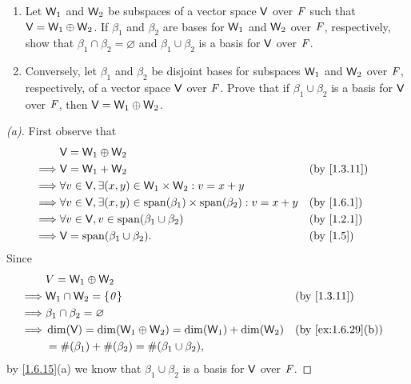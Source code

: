 \setcounter{ex}{32}
\begin{ex}\label{ex:1.6.33}
	\quad
	\begin{enumerate}
		\item Let \(\mathsf{W}_1\) and \(\mathsf{W}_2\) be subspaces of a vector space \(\mathsf{V}\) over \(\mathit{F}\) such that \(\mathsf{V} = \mathsf{W}_1 \oplus \mathsf{W}_2\).
		      If \(\beta_1\) and \(\beta_2\) are bases for \(\mathsf{W}_1\) and \(\mathsf{W}_2\) over \(\mathit{F}\), respectively, show that \(\beta_1 \cap \beta_2 = \varnothing\) and \(\beta_1 \cup \beta_2\) is a basis for \(\mathsf{V}\) over \(\mathit{F}\).
		\item Conversely, let \(\beta_1\) and \(\beta_2\) be disjoint bases for subspaces \(\mathsf{W}_1\) and \(\mathsf{W}_2\) over \(\mathit{F}\), respectively, of a vector space \(\mathsf{V}\) over \(\mathit{F}\).
		      Prove that if \(\beta_1 \cup \beta_2\) is a basis for \(\mathsf{V}\) over \(\mathit{F}\), then \(\mathsf{V} = \mathsf{W}_1 \oplus \mathsf{W}_2\).
	\end{enumerate}
\end{ex}

\begin{proof}[(a)]
	First observe that
	\begin{align*}
		         & \V = \W_1 \oplus \W_2                                                                                \\
		\implies & \V = \W_1 + \W_2                                                                    &  & \by{1.3.11} \\
		\implies & \forall v \in \V, \exists (x, y) \in \W_1 \times \W_2 : v = x + y                                    \\
		\implies & \forall v \in \V, \exists (x, y) \in \spn{\beta_1} \times \spn{\beta_2} : v = x + y &  & \by{1.6.1}  \\
		\implies & \forall v \in \V, v \in \spn{\beta_1 \cup \beta_2}                                  &  & \by{1.2.1}  \\
		\implies & \V = \spn{\beta_1 \cup \beta_2}.                                                    &  & \by{1.5}
	\end{align*}
	Since
	\begin{align*}
		         & V = \W_1 \oplus \W_2                                                               \\
		\implies & \W_1 \cap \W_2 = \set{\zv}                                  &  & \by{1.3.11}       \\
		\implies & \beta_1 \cap \beta_2 = \varnothing                                                 \\
		\implies & \dim(\V) = \dim(\W_1 \oplus \W_2) = \dim(\W_1) + \dim(\W_2) &  & \by{ex:1.6.29}[b] \\
		         & = \#(\beta_1) + \#(\beta_2) = \#(\beta_1 \cup \beta_2),
	\end{align*}
	by \cref{1.6.15}(a) we know that \(\beta_1 \cup \beta_2\) is a basis for \(\mathsf{V}\) over \(\mathit{F}\).
\end{proof}

